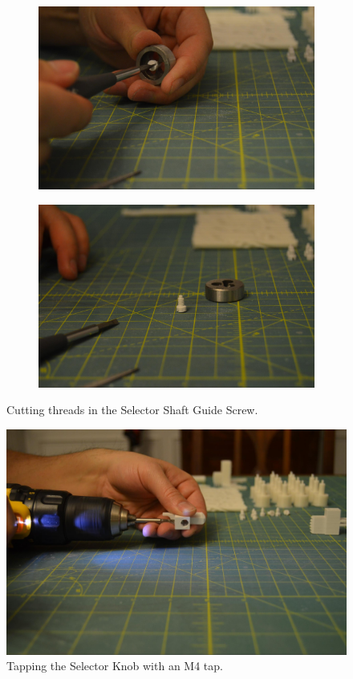 \documentclass[openany]{book}
\begin{document}
\begin{figure}[!ht]
	\begin{subfigure}{.4\textwidth}
	\centering
	\includegraphics[width=.95\textwidth]{images/image16.jpg}
	\label{fig:image16}	
\end{subfigure}
\begin{subfigure}{.4\textwidth}
	\centering
	\includegraphics[width=.95\textwidth]{images/image2.jpg}
	\label{fig:image2}	
\end{subfigure}
\caption{Cutting threads in the Selector Shaft Guide Screw.}
\label{fig:guidescrew}
\end{figure}

\begin{figure}[!ht]
	\centering
	\includegraphics[width=.75\textwidth]{images/image6.jpg}
	\caption{Tapping the Selector Knob with an M4 tap.}
	\label{fig:image6}	
\end{figure}
\end{document}
